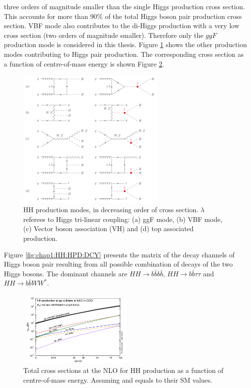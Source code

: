 three orders of magnitude smaller than the single Higgs production cross section. This accounts for more than 90\% of the total Higgs boson pair production cross section. VBF mode also contributes to the di-Higgs production with a very low cross section (two orders of magnitude smaller). Therefore only the $ggF$ production mode is considered in this thesis. Figure \ref{fig:chap1:HH:HPD:FYS} shows the other production modes contributing to Higgs pair production. The corresponding cross section as a function of centre-of-mass energy is shown Figure \ref{fig:chap1:HH:BSM:XSEC:S}. \\
\begin{figure}[htbp]
    \centering
    \includegraphics[width=0.65\textwidth]{Ch1/Img/HH_feyns.png}
    \caption{HH production modes, in decreasing order of cross section. $\lambda$ referees to Higgs tri-linear coupling: (a) ggF mode, (b) VBF mode, (c) Vector boson association (VH) and (d) top associated production.}
    \label{fig:chap1:HH:HPD:FYS}
\end{figure}
Figure \ref{fig:chap1:HH:HPD:DCY} presents the matrix of the decay channels of Higgs boson pair resulting from all possible combination of decays of the two Higgs bosons. The dominant channels are $HH\rightarrow b\bar{b}b\bar{b}$, $HH\rightarrow b\bar{b}\tau\tau$ and $HH\rightarrow b\bar{b}WW^*$. 
\begin{figure}[htbp]
    \centering
    \includegraphics[width=0.5\textwidth]{Ch1/Img/HH_XSec_as_S.png}
    \caption{Total cross sections at the NLO for HH production as a function of centre-of-mass energy. Assuming \kl and \kt equals to their SM values.}
    \label{fig:chap1:HH:BSM:XSEC:S}
\end{figure}
